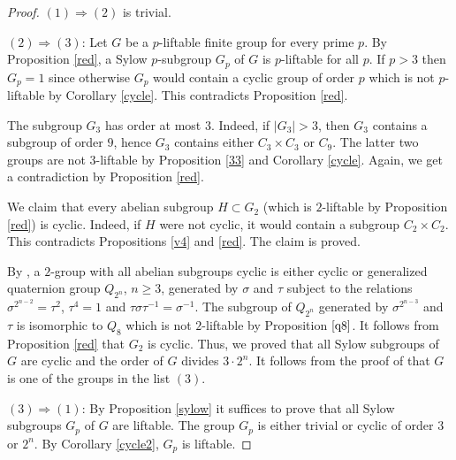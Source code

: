 \documentclass[12pt]{amsart}
\numberwithin{equation}{section}
\theoremstyle{definition}
\renewcommand{\(}{\bigl(}
\renewcommand{\)}{\bigr)}
\newcommand{\inv}{^{-1}}
\renewcommand{\geq}{\geqslant}
\begin{document}
\begin{proof}
$(1)\Rightarrow (2)$ is trivial.

$(2)\Rightarrow (3)$: Let $G$ be a $p$-liftable finite group for every prime $p$.
By Proposition \ref{red}, a Sylow $p$-subgroup $G_p$ of $G$ is $p$-liftable for all $p$.
If $p>3$ then $G_p=1$ since otherwise $G_p$ would contain a cyclic group of order $p$ which is not
$p$-liftable by Corollary \ref{cycle}. This contradicts Proposition \ref{red}.

The subgroup $G_3$ has order at most $3$. Indeed, if $|G_3|>3$, then $G_3$ contains a subgroup of order $9$, hence
$G_3$ contains either $C_3\times C_3$ or $C_9$. The latter two groups are not $3$-liftable by
Proposition \ref{33} and Corollary \ref{cycle}. Again, we get a contradiction by Proposition \ref{red}.

We claim that every abelian subgroup $H\subset G_2$ (which is $2$-liftable by Proposition \ref{red}) is cyclic.
Indeed, if $H$ were not cyclic, it would contain a subgroup $C_2\times C_2$. This contradicts Propositions
\ref{v4} and \ref{red}. The claim is proved.

By \cite[Chapter IV, Corollary 6.6]{AM}, a $2$-group with all abelian subgroups cyclic is either cyclic or
generalized quaternion group $Q_{2^n}$, $n\geq 3$,
generated by $\sigma$ and $\tau$ subject to the relations $\sigma^{2^{n-2}}=\tau^2$, $\tau^4=1$ and
$\tau\sigma\tau\inv =\sigma\inv$. The subgroup of $Q_{2^n}$ generated by $\sigma^{2^{n-3}}$ and $\tau$ is isomorphic
to $Q_8$ which is not $2$-liftable by Proposition $\ref{q8}$. It follows from Proposition \ref{red} that $G_2$ is cyclic.
Thus, we proved that all Sylow subgroups of $G$ are cyclic and the order of $G$ divides $3\cdot 2^n$.
It follows from the proof of \cite[Proposition 2.4]{KL} that $G$ is one of the groups in the list $(3)$.

$(3)\Rightarrow (1)$: By Proposition \ref{sylow} it suffices to prove that all Sylow subgroups $G_p$ of $G$ are liftable.
The group $G_p$ is either trivial or cyclic of order $3$ or $2^n$. By Corollary \ref{cycle2}, $G_p$ is liftable.
\end{proof}
\end{document}
